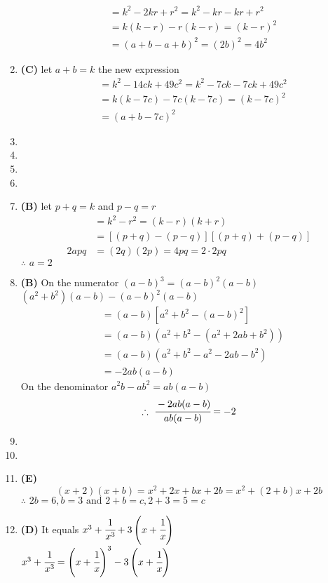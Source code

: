 \begin{multicols}{2}
\begin{enumerate}[label={\textbf{\arabic*.}}]
\begin{align*}
&= k^2 - 2kr + r^2 = k^2 -kr - kr + r^2 \\
&= k(k-r)-r(k-r) = (k-r)^2 \\
& = (a+b-a + b)^2 = (2b)^2 = 4b^2
\end{align*}
\item \textbf{(C)} let $a+b=k$ the new expression
\begin{align*}
&=  k^2 - 14ck + 49c^2 = k^2 - 7ck -7ck + 49c^2 \\
& = k(k-7c) -7c(k -7c) = (k-7c)^2 \\
& = (a + b -7c)^2
\end{align*}
\item
\item
\item
\item
\item \textbf{(B)} let $p+q = k$ and $p-q = r$
\begin{align*}
&= k^2 - r^2 = (k-r)(k+r) \\
&= [(p+q) -(p-q)][(p+q)+(p-q)] \\
2apq & = (2q)(2p) = 4pq = 2\cdot 2 pq
\end{align*}
$\therefore \,\, a = 2$
\item \textbf{(B)} On the numerator $(a-b)^3=(a-b)^2(a-b)$ \vspace{5pt}\\
$(a^2 + b^2)(a-b) - (a-b)^2(a-b)$ \vspace{-8pt}
\begin{align*}
& = (a-b)[a^2 +b^2 -(a-b)^2] \\
& = (a-b)(a^2 + b^2 - (a^2 + 2ab + b^2)) \\
& = (a-b)(a^2 + b^2 - a^2 -2ab -b^2) \\
&= -2ab(a-b)
\end{align*}
On the denominator $a^2b -ab^2 = ab(a-b)$ \\
$$\therefore \,\, \cfrac{-2ab(a-b)}{ab(a-b)}= -2$$
\item
\item
\item \textbf{(E)} $$(x+2)(x+b) = x^2 + 2x + bx + 2b = x^2 + (2 +b)x + 2b$$
$\therefore \,\, 2b = 6,b = 3 \text{ and } 2 + b = c, 2+ 3 = 5 = c$
\item \textbf{(D)} It equals $x^3 + \cfrac{1}{x^3} + 3\left(x+ \cfrac{1}{x}\right)$ \\
$x^3 + \cfrac{1}{x^3}= \left(x + \cfrac{1}{x}\right)^3 - 3\left(x + \cfrac{1}{x}\right)$ \\

\end{enumerate}
\end{multicols}
